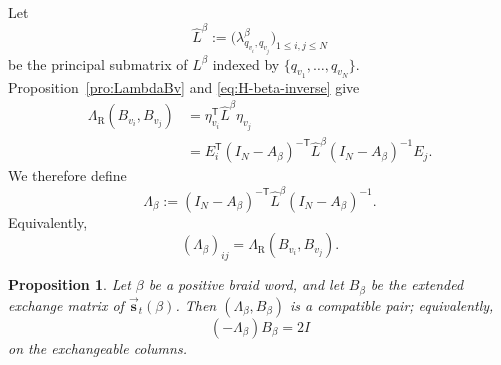 \documentclass[12pt, reqno]{amsart}
\theoremstyle{plain}
\newtheorem{proposition}[theorem]{Proposition}
\theoremstyle{definition}
\numberwithin{equation}{section}
\newcommand{\LambdaR}{\Lambda_{\mathrm R}}
\begin{document}
Let
\begin{equation*}
    \widehat L^\beta
    :=
    \bigl(
        \lambda_{q_{v_i},q_{v_j}}^\beta
    \bigr)_{1\leq i,j\leq N}
\end{equation*}
be the principal submatrix of \(L^\beta\) indexed by
\(\{q_{v_1},\ldots,q_{v_N}\}\). Proposition~\ref{pro:LambdaBv} and
\eqref{eq:H-beta-inverse} give
\begin{align}
    \LambdaR(B_{v_i},B_{v_j})
    &=
    \eta_{v_i}^{\mathsf T}
    \widehat L^\beta\eta_{v_j}
    \nonumber\\
    &=
    E_i^{\mathsf T}
    (I_N-A_\beta)^{-\mathsf T}
    \widehat L^\beta
    (I_N-A_\beta)^{-1}E_j.
    \label{eq:LambdaBvbv'}
\end{align}
We therefore define
\begin{equation}\label{eq:Lambda-beta-definition}
    \Lambda_\beta
    :=
    (I_N-A_\beta)^{-\mathsf T}
    \widehat L^\beta
    (I_N-A_\beta)^{-1}.
\end{equation}
Equivalently,
\begin{equation*}
    (\Lambda_\beta)_{ij}
    =
    \LambdaR(B_{v_i},B_{v_j}).
\end{equation*}

\begin{proposition}\label{pro:compatible-Lambda-beta}
Let \(\beta\) be a positive braid word, and let \(B_\beta\) be the
extended exchange matrix of
\(\overrightarrow{\mathbf s}_t(\beta)\). Then
\((\Lambda_\beta,B_\beta)\) is a compatible pair; equivalently,
\begin{equation*}
    (-\Lambda_\beta)B_\beta=2I
\end{equation*}
on the exchangeable columns.
\end{proposition}
\end{document}
